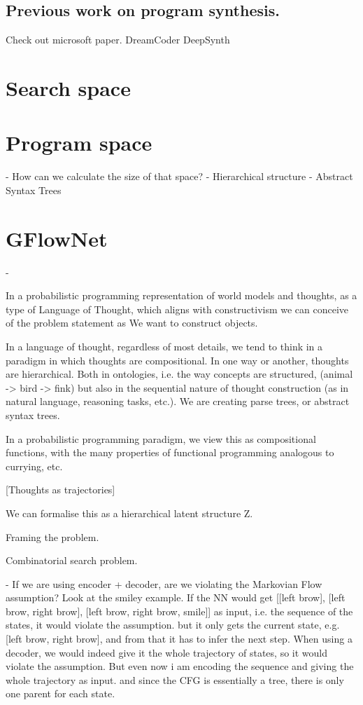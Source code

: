 \subsection{Previous work on program synthesis.}
Check out microsoft paper.
DreamCoder
DeepSynth
\section{Search space}
\section{Program space}
- How can we calculate the size of that space?
- Hierarchical structure 
- Abstract Syntax Trees

\section{GFlowNet}
-







In a probabilistic programming representation of world models and thoughts, as a type of Language of Thought, which aligns with constructivism we can conceive of the problem statement as 
We want to construct objects.

In a language of thought, regardless of most details, we tend to think in a paradigm in which thoughts are compositional. In one way or another, thoughts are hierarchical.
Both in ontologies, i.e. the way concepts are structured, (animal -> bird -> fink) but also in the sequential nature of thought construction (as in natural language, reasoning tasks, etc.). We are creating parse trees, or abstract syntax trees. 

In a probabilistic programming paradigm, we view this as compositional functions, with the many properties of functional programming analogous to currying, etc. 

[Thoughts as trajectories]

We can formalise this as a hierarchical latent structure Z.

Framing the problem.

Combinatorial search problem. 

- If we are using encoder + decoder, are we violating the Markovian Flow assumption?
    Look at the smiley example. If the NN would get [[left brow], [left brow, right brow], [left brow, right brow, smile]] as input, i.e. the sequence of the states, it would violate the assumption. but it only gets the current state, e.g. [left brow, right brow], and from that it has to infer the next step. 
    When using a decoder, we would indeed give it the whole trajectory of states, so it would violate the assumption.
    But even now i am encoding the sequence and giving the whole trajectory as input. and since the CFG is essentially a tree, there is only one parent for each state. 


